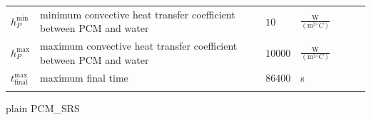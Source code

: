 \documentclass[12pt]{article}
\begin{document}
\begin{tabular}{l p{10cm} l l l l l}
\\
${h_{P}^{\text{min}}}$ & minimum convective heat transfer coefficient between PCM and water & $10$ & $\frac{\text{W}}{(\text{m}^{2}{}^{\circ}C)}$
\\
${h_{P}^{\text{max}}}$ & maximum convective heat transfer coefficient between PCM and water & $10000$ & $\frac{\text{W}}{(\text{m}^{2}{}^{\circ}C)}$
\\
${t_{\text{final}}^{\text{max}}}$ & maximum final time & $86400$ & s
\\
\bottomrule
\label{Table:AuxiCons}
\end{tabular}

 {plain}
 {PCM_SRS}
\end{document}
